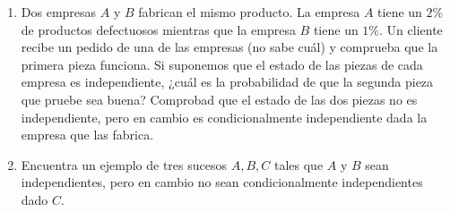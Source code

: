 \documentclass[
]{article}
\begin{document}
\begin{enumerate}
\def\labelenumi{\arabic{enumi}.}
\setcounter{enumi}{3}
\item
  Dos empresas \(A\) y \(B\) fabrican el mismo producto. La empresa
  \(A\) tiene un \(2\%\) de productos defectuosos mientras que la
  empresa \(B\) tiene un \(1\%\). Un cliente recibe un pedido de una de
  las empresas (no sabe cuál) y comprueba que la primera pieza funciona.
  Si suponemos que el estado de las piezas de cada empresa es
  independiente, ¿cuál es la probabilidad de que la segunda pieza que
  pruebe sea buena? Comprobad que el estado de las dos piezas no es
  independiente, pero en cambio es condicionalmente independiente dada
  la empresa que las fabrica.
\item
  Encuentra un ejemplo de tres sucesos \(A,B,C\) tales que \(A\) y \(B\)
  sean independientes, pero en cambio no sean condicionalmente
  independientes dado \(C\).
\end{enumerate}
\end{document}
